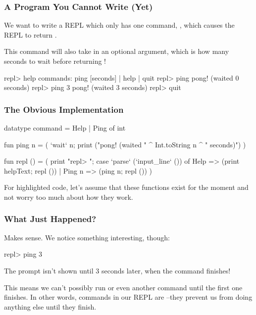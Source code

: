 \documentclass[aspectratio=169]{beamer}
\begin{document}
\begin{frame}[fragile]
  \frametitle{A Program You Cannot Write (Yet)}


  We want to write a REPL which only has one command, , which
  causes the REPL to return .

  \pause
  \vspace{\fill}

  This command will also take in an optional argument, which is how many
  seconds to wait before returning !

  \begin{codeblock}[language={}]
repl> help
commands: ping [seconds] | help | quit
repl> ping
pong! (waited 0 seconds)
repl> ping 3
pong! (waited 3 seconds)
repl> quit
\end{codeblock}
\end{frame}

\begin{frame}[fragile]
  \frametitle{The Obvious Implementation}

  {\small
  \begin{codeblock}
    datatype command = Help | Ping of int

    fun ping n =
      ( `wait` n;
        print ("pong! (waited " ^ Int.toString n ^ " seconds)")
      )

    fun repl () =
      ( print "repl> ";
        case `parse` (`input_line` ()) of
          Help => (print helpText; repl ())
        | Ping n => (ping n; repl ())
      )
\end{codeblock}
  }

  For highlighted code, let's assume that these functions exist
  for the moment and not worry too much about how they work.
\end{frame}

\begin{frame}[fragile]
  \frametitle{What Just Happened?}

  Makes sense. We notice something interesting, though:

  \pause
  \vspace{\fill}

  \begin{codeblock}
    repl> ping 3
\end{codeblock}

  \pause
  \vspace{\fill}

  The  prompt isn't shown until 3 seconds later,
  when the  command finishes!

  \pause
  \vspace{\fill}

  This means we can't possibly run  or even another
   command until the first one finishes. In other words,
  commands in our REPL are --they prevent us from
  doing anything else until they finish.
\end{frame}
\end{document}
